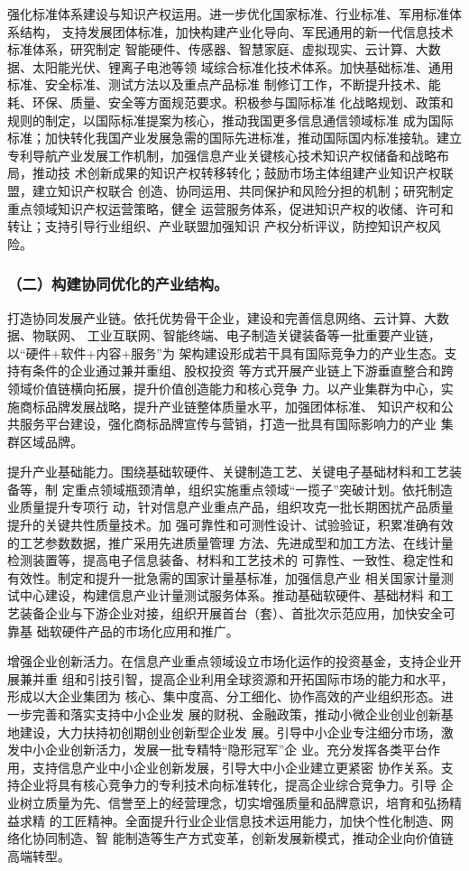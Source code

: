\documentclass[11pt]{ctexart}
\begin{document}
{{{{强化标准体系建设与知识产权运用。进一步优化国家标准、行业标准、军用标准体系结构，
支持发展团体标准，加快构建产业化导向、军民通用的新一代信息技术标准体系，研究制定
智能硬件、传感器、智慧家庭、虚拟现实、云计算、大数据、太阳能光伏、锂离子电池等领
域综合标准化技术体系。加快基础标准、通用标准、安全标准、测试方法以及重点产品标准
制修订工作，不断提升技术、能耗、环保、质量、安全等方面规范要求。积极参与国际标准
化战略规划、政策和规则的制定，以国际标准提案为核心，推动我国更多信息通信领域标准
成为国际标准；加快转化我国产业发展急需的国际先进标准，推动国际国内标准接轨。建立
专利导航产业发展工作机制，加强信息产业关键核心技术知识产权储备和战略布局，推动技
术创新成果的知识产权转移转化；鼓励市场主体组建产业知识产权联盟，建立知识产权联合
创造、协同运用、共同保护和风险分担的机制；研究制定重点领域知识产权运营策略，健全
运营服务体系，促进知识产权的收储、许可和转让；支持引导行业组织、产业联盟加强知识
产权分析评议，防控知识产权风险。

\subsubsection{（二）构建协同优化的产业结构。}
\label{sec:org09a7b7c}
打造协同发展产业链。依托优势骨干企业，建设和完善信息网络、云计算、大数据、物联网、
工业互联网、智能终端、电子制造关键装备等一批重要产业链，以“硬件+软件+内容+服务”为
架构建设形成若干具有国际竞争力的产业生态。支持有条件的企业通过兼并重组、股权投资
等方式开展产业链上下游垂直整合和跨领域价值链横向拓展，提升价值创造能力和核心竞争
力。以产业集群为中心，实施商标品牌发展战略，提升产业链整体质量水平，加强团体标准、
知识产权和公共服务平台建设，强化商标品牌宣传与营销，打造一批具有国际影响力的产业
集群区域品牌。

提升产业基础能力。围绕基础软硬件、关键制造工艺、关键电子基础材料和工艺装备等，制
定重点领域瓶颈清单，组织实施重点领域“一揽子”突破计划。依托制造业质量提升专项行
动，针对信息产业重点产品，组织攻克一批长期困扰产品质量提升的关键共性质量技术。加
强可靠性和可测性设计、试验验证，积累准确有效的工艺参数数据，推广采用先进质量管理
方法、先进成型和加工方法、在线计量检测装置等，提高电子信息装备、材料和工艺技术的
可靠性、一致性、稳定性和有效性。制定和提升一批急需的国家计量基标准，加强信息产业
相关国家计量测试中心建设，构建信息产业计量测试服务体系。推动基础软硬件、基础材料
和工艺装备企业与下游企业对接，组织开展首台（套）、首批次示范应用，加快安全可靠基
础软硬件产品的市场化应用和推广。

增强企业创新活力。在信息产业重点领域设立市场化运作的投资基金，支持企业开展兼并重
组和引技引智，提高企业利用全球资源和开拓国际市场的能力和水平，形成以大企业集团为
核心、集中度高、分工细化、协作高效的产业组织形态。进一步完善和落实支持中小企业发
展的财税、金融政策，推动小微企业创业创新基地建设，大力扶持初创期创业创新型企业发
展。引导中小企业专注细分市场，激发中小企业创新活力，发展一批专精特“隐形冠军”企
业。充分发挥各类平台作用，支持信息产业中小企业创新发展，引导大中小企业建立更紧密
协作关系。支持企业将具有核心竞争力的专利技术向标准转化，提高企业综合竞争力。引导
企业树立质量为先、信誉至上的经营理念，切实增强质量和品牌意识，培育和弘扬精益求精
的工匠精神。全面提升行业企业信息技术运用能力，加快个性化制造、网络化协同制造、智
能制造等生产方式变革，创新发展新模式，推动企业向价值链高端转型。

}}}}
\end{document}
